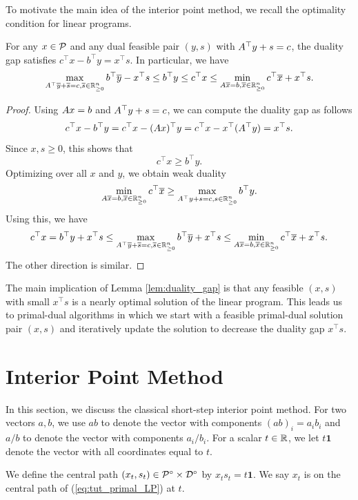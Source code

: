 To motivate the main idea of the interior point method, we recall
the optimality condition for linear programs.
\begin{lem}
\label{lem:duality_gap}For any $x\in\mathcal{P}$ and any dual feasible
pair $(y,s)$ with $A^{\top}y+s=c$, the duality gap satisfies $c^{\top}x-b^{\top}y=x^{\top}s$.
In particular, we have
\[
\max_{A^{\top}\overline{y}+\overline{s}=c,\overline{s}\in\mathbb{R}^{n}_{\geq0}}b^{\top}\overline{y}-x^{\top}s\leq b^{\top}y\leq c^{\top}x\leq\min_{A\overline{x}=b,\overline{x}\in\mathbb{R}^{n}_{\geq0}}c^{\top}\overline{x}+x^{\top}s.
\]
\end{lem}

\begin{proof}
Using $A x=b$ and $A^{\top}y+s=c$, we can compute the duality
gap as follows
\[
c^{\top}x-b^{\top}y=c^{\top}x-(A x)^{\top}y=c^{\top}x-x^{\top}(A^{\top}y)=x^{\top}s.
\]
Since $x,s\geq0$, this shows that 
\[
c^{\top}x\geq b^{\top}y.
\]
Optimizing over all $x$ and $y$, we obtain weak duality
\[
\min_{A\overline{x}=b,\overline{x}\in\mathbb{R}^{n}_{\geq0}}c^{\top}\overline{x}\geq\max_{A^{\top}y+s=c,s\in\mathbb{R}^{n}_{\geq0}}b^{\top}y.
\]
Using this, we have
\[
c^{\top}x=b^{\top}y+x^{\top}s\leq\max_{A^{\top}\overline{y}+\overline{s}=c,\overline{s}\in\mathbb{R}^{n}_{\geq0}}b^{\top}\overline{y}+x^{\top}s\leq\min_{A\overline{x}=b,\overline{x}\in\mathbb{R}^{n}_{\geq0}}c^{\top}\overline{x}+x^{\top}s.
\]
The other direction is similar.
\end{proof}
The main implication of Lemma \ref{lem:duality_gap} is that any feasible
$(x,s)$ with small $x^{\top}s$ is a nearly optimal solution of the
linear program. This leads us to primal-dual algorithms in which we
start with a feasible primal-dual solution pair $(x,s)$ and iteratively
update the solution to decrease the duality gap $x^{\top}s$. 

\section{Interior Point Method}

In this section, we discuss the classical short-step interior point
method. For two vectors $a,b$, we use $ab$ to denote the vector
with components $(ab)_{i}=a_{i}b_{i}$ and $a/b$ to denote the vector
with components $a_{i}/b_{i}$. For a scalar $t\in\mathbb{R}$, we let $t\mathbf{1}$
denote the vector with all coordinates equal to $t$. 
\begin{defn}
\label{def:central_path}We define the central path $(x_{t},s_{t})\in\mathcal{P}^{\circ}\times\mathcal{D}^{\circ}$
by $x_{t}s_{t}=t\mathbf{1}$. We say $x_{t}$ is on the central path
of (\ref{eq:tut_primal_LP}) at $t$.
\end{defn}

